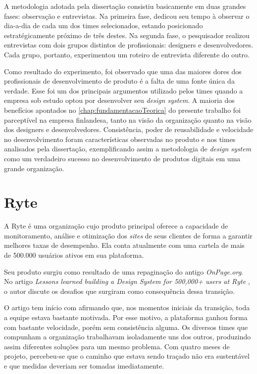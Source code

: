 A metodologia adotada pela dissertação consistiu basicamente em duas grandes fases: observação e entrevistas. Na primeira fase,  dedicou seu tempo à observar o dia-a-dia de cada um dos times selecionados, estando posicionado estratégicamente próximo de três destes. Na segunda fase, o pesquisador realizou entrevistas com dois grupos distintos de profissionais: designers e desenvolvedores. Cada grupo, portanto, experimentou um roteiro de entrevista diferente do outro.

Como resultado do experimento, foi observado que uma das maiores dores dos profissionais de desenvolvimento de produto é a falta de uma fonte única da verdade. Esse foi um dos principais argumentos utilizado pelos times quando a empresa sob estudo optou por desenvolver seu \textit{design system}. A maioria dos benefícios apontados no \autoref{chap:fundamentacaoTeorica} do presente trabalho foi parceptível na empresa finlandesa, tanto na visão da organização quanto na visão dos designers e desenvolvedores. Consistência, poder de reusabilidade e velocidade no desenvolvimento foram características observadas no produto e nos times analisados pela dissertação, exemplificando assim a metodologia de \textit{design system} como um verdadeiro sucesso no desenvolvimento de produtos digitais em uma grande organização.

\section{Ryte}
\label{sec:ryte}

A Ryte é uma organização cujo produto principal oferece a capacidade de monitoramento, análise e otimização dos \textit{sites} de seus clientes de forma a garantir melhores taxas de desempenho. Ela conta atualmente com uma cartela de mais de 500.000 usuários ativos em sua plataforma.

Seu produto surgiu como resultado de uma repaginação do antigo \textit{OnPage.org}. No artigo \textit{Lessons learned building a Design System for 500,000+ users at Ryte} \cite{ryteDesignSystem}, o autor discute os desafios que surgiram como consequência dessa transição.

O artigo tem início com  afirmando que, nos momentos iniciais da transição, toda a equipe estava bastante motivada. Por esse motivo, a plataforma ganhou forma com bastante velocidade, porém sem consistência alguma. Os diversos times que compunham a organização trabalhavam isoladamente uns dos outros, produzindo assim diferentes soluções para um mesmo problema. Com quatro meses de projeto, percebeu-se que o caminho que estava sendo traçado não era sustentável e que medidas deveriam ser tomadas imediatamente.

